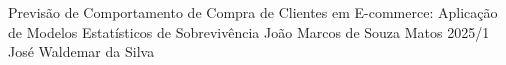 \documentclass[12pt,openright]{paper}
\begin{document}


\capa
{Previsão de Comportamento de Compra de Clientes em E-commerce: Aplicação de Modelos Estatísticos de Sobrevivência}
{João Marcos de Souza Matos}
{2025/1}
{José Waldemar da Silva}

\printnomenclature

\onehalfspacing
\clearpage
{}
\pagestyle{cabecalhorodape}


\tableofcontents
\thispagestyle{empty}
\cleardoublepage




\newpage


\newpage


\newpage


\newpage


\newpage


\newpage
\def\thispagestyle#1{}
%


\end{document}
